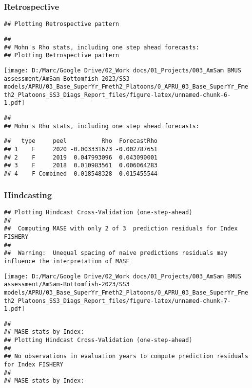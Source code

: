 \documentclass[
]{article}
\begin{document}
\hypertarget{retrospective}{%
\subsubsection{Retrospective}\label{retrospective}}

\begin{verbatim}
## Plotting Retrospective pattern
\end{verbatim}

\begin{verbatim}
## 
## Mohn's Rho stats, including one step ahead forecasts:
## Plotting Retrospective pattern
\end{verbatim}

\texttt{[image: D:/Marc/Google Drive/02\_Work docs/01\_Projects/003\_AmSam BMUS assessment/AmSam-Bottomfish-2023/SS3 models/APRU/03\_Base\_SuperYr\_Fmeth2\_Platoons/0\_APRU\_03\_Base\_SuperYr\_Fmeth2\_Platoons\_SS3\_Diags\_Report\_files/figure-latex/unnamed-chunk-6-1.pdf]}

\begin{verbatim}
## 
## Mohn's Rho stats, including one step ahead forecasts:
\end{verbatim}

\begin{verbatim}
##   type     peel          Rho  ForecastRho
## 1    F     2020 -0.003331673 -0.002787651
## 2    F     2019  0.047993096  0.043090001
## 3    F     2018  0.010983561  0.006064283
## 4    F Combined  0.018548328  0.015455544
\end{verbatim}

\hypertarget{hindcasting}{%
\subsubsection{Hindcasting}\label{hindcasting}}

\begin{verbatim}
## Plotting Hindcast Cross-Validation (one-step-ahead) 
## 
##  Computing MASE with only 2 of 3  prediction residuals for Index FISHERY 
## 
##  Warning:  Unequal spacing of naive predictions residuals may influence the interpretation of MASE
\end{verbatim}

\texttt{[image: D:/Marc/Google Drive/02\_Work docs/01\_Projects/003\_AmSam BMUS assessment/AmSam-Bottomfish-2023/SS3 models/APRU/03\_Base\_SuperYr\_Fmeth2\_Platoons/0\_APRU\_03\_Base\_SuperYr\_Fmeth2\_Platoons\_SS3\_Diags\_Report\_files/figure-latex/unnamed-chunk-7-1.pdf]}

\begin{verbatim}
## 
## MASE stats by Index:
## Plotting Hindcast Cross-Validation (one-step-ahead) 
## 
## No observations in evaluation years to compute prediction residuals for Index FISHERY 
## 
## MASE stats by Index:
\end{verbatim}
\end{document}
